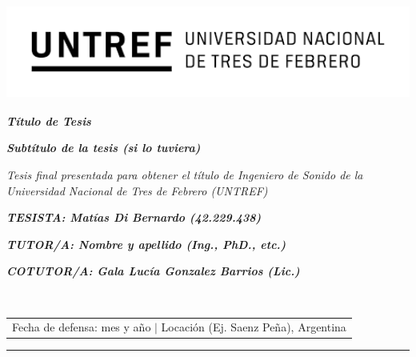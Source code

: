 \documentclass[12pt]{article}
\begin{document}
\begin{titlepage}
\centering
\includegraphics[width=13.58cm, height=3.1cm]{Logo Untref.png} 

\vspace{0.1cm}

\hspace*{-1.31cm}%
\begin{minipage}[t]{16cm}
\centering
{}
\vspace{0.5cm} %

\end{minipage}


\vspace{36pt}

{\bfseries\itshape\fontsize{22pt}{24pt} \selectfont Título de Tesis \par}

\vspace{22pt}

{\itshape\fontsize{18pt}{24pt}\selectfont \textbf{Subtítulo de la tesis (si lo tuviera)} \par}

\vspace{44pt}

{\itshape\fontsize{14pt}{24pt}\selectfont Tesis final presentada para obtener el título de Ingeniero de Sonido de la Universidad Nacional de Tres de Febrero (UNTREF) \par}

\vspace{70pt}

{\bfseries\itshape\fontsize{14pt}{0pt}\selectfont TESISTA: Matías Di Bernardo (42.229.438) \par}
{\bfseries\itshape\fontsize{14pt}{0pt}\selectfont TUTOR/A: Nombre y apellido (Ing., PhD., etc.) \par}
{\bfseries\itshape\fontsize{14pt}{0pt}\selectfont COTUTOR/A: Gala Lucía Gonzalez Barrios (Lic.) \par}

\vfill

\begin{table}[h]
\hrulefill \\ 
\begin{tabular}{c}
Fecha de defensa: mes y año $\lvert$ Locación (Ej. Saenz Peña), Argentina \\
\end{tabular}
\end{table}
\hrule
\end{titlepage}
\end{document}

